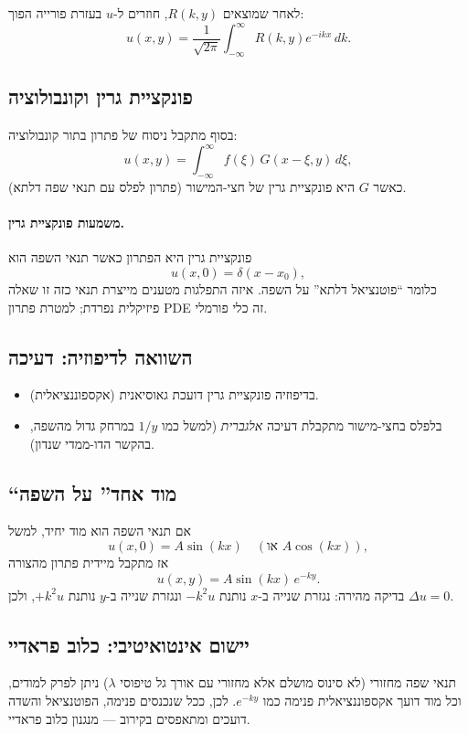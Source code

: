 לאחר שמוצאים $R(k,y)$, חוזרים ל-$u$ בעזרת פורייה הפוך:
\begin{equation}
u(x,y)=\frac{1}{\sqrt{2\pi}}\int_{-\infty}^{\infty} R(k,y)e^{-ikx}\,dk.
\end{equation}

\subsection{פונקציית גרין וקונבולוציה}
בסוף מתקבל ניסוח של פתרון בתור קונבולוציה:
\begin{equation}
u(x,y)=\int_{-\infty}^{\infty} f(\xi)\,G(x-\xi,y)\,d\xi,
\end{equation}
כאשר $G$ היא פונקציית גרין של חצי-המישור (פתרון לפלס עם תנאי שפה דלתא).

\paragraph{משמעות פונקציית גרין.}
פונקציית גרין היא הפתרון כאשר תנאי השפה הוא
\[
u(x,0)=\delta(x-x_0),
\]
כלומר ``פוטנציאל דלתא'' על השפה. איזה התפלגות מטענים מייצרת תנאי כזה זו שאלה פיזיקלית נפרדת; למטרת פתרון PDE זה כלי פורמלי.

\subsection{השוואה לדיפוזיה: דעיכה}
\begin{itemize}
  \item בדיפוזיה פונקציית גרין דועכת גאוסיאנית (אקספוננציאלית).
  \item בלפלס בחצי-מישור מתקבלת דעיכה \emph{אלגברית} (למשל כמו $1/y$ במרחק גדול מהשפה, בהקשר הדו-ממדי שנדון).
\end{itemize}

\subsection{``מוד אחד'' על השפה}
אם תנאי השפה הוא מוד יחיד, למשל
\begin{equation}
u(x,0)=A\sin(kx)\quad(\text{או }A\cos(kx)),
\end{equation}
אז מתקבל מיידית פתרון מהצורה
\begin{equation}
u(x,y)=A\sin(kx)\,e^{-ky}.
\end{equation}
בדיקה מהירה: נגזרת שנייה ב-$x$ נותנת $-k^2u$ ונגזרת שנייה ב-$y$ נותנת $+k^2u$, ולכן $\Delta u=0$.

\subsection{יישום אינטואיטיבי: כלוב פראדיי}
תנאי שפה מחזורי (לא סינוס מושלם אלא מחזורי עם אורך גל טיפוסי $\lambda$) ניתן לפרק למודים, וכל מוד דועך אקספוננציאלית פנימה כמו $e^{-ky}$. לכן, ככל שנכנסים פנימה, הפוטנציאל והשדה דועכים ומתאפסים בקירוב --- מנגנון כלוב פראדיי.

